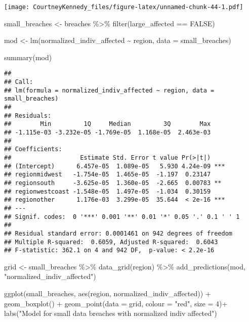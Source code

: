 \documentclass[
]{article}
\newenvironment{Shaded}{\begin{snugshade}}{\end{snugshade}}
\newcommand{\AttributeTok}[1]{\textcolor[rgb]{0.77,0.63,0.00}{#1}}
\newcommand{\ConstantTok}[1]{\textcolor[rgb]{0.00,0.00,0.00}{#1}}
\newcommand{\DecValTok}[1]{\textcolor[rgb]{0.00,0.00,0.81}{#1}}
\newcommand{\FunctionTok}[1]{\textcolor[rgb]{0.00,0.00,0.00}{#1}}
\newcommand{\NormalTok}[1]{#1}
\newcommand{\OtherTok}[1]{\textcolor[rgb]{0.56,0.35,0.01}{#1}}
\newcommand{\SpecialCharTok}[1]{\textcolor[rgb]{0.00,0.00,0.00}{#1}}
\newcommand{\StringTok}[1]{\textcolor[rgb]{0.31,0.60,0.02}{#1}}
\begin{document}
\texttt{[image: CourtneyKennedy\_files/figure-latex/unnamed-chunk-44-1.pdf]}

\begin{Shaded}
\begin{Highlighting}[]
\NormalTok{small\_breaches }\OtherTok{\textless{}{-}}\NormalTok{ breaches }\SpecialCharTok{\%\textgreater{}\%}
  \FunctionTok{filter}\NormalTok{(large\_affected }\SpecialCharTok{==} \ConstantTok{FALSE}\NormalTok{)}

\NormalTok{mod }\OtherTok{\textless{}{-}} \FunctionTok{lm}\NormalTok{(normalized\_indiv\_affected }\SpecialCharTok{\textasciitilde{}}\NormalTok{ region, }\AttributeTok{data =}\NormalTok{ small\_breaches)}

\FunctionTok{summary}\NormalTok{(mod)}
\end{Highlighting}
\end{Shaded}

\begin{verbatim}
## 
## Call:
## lm(formula = normalized_indiv_affected ~ region, data = small_breaches)
## 
## Residuals:
##        Min         1Q     Median         3Q        Max 
## -1.115e-03 -3.232e-05 -1.769e-05  1.168e-05  2.463e-03 
## 
## Coefficients:
##                   Estimate Std. Error t value Pr(>|t|)    
## (Intercept)      6.457e-05  1.089e-05   5.930 4.24e-09 ***
## regionmidwest   -1.754e-05  1.465e-05  -1.197  0.23147    
## regionsouth     -3.625e-05  1.360e-05  -2.665  0.00783 ** 
## regionwestcoast -1.548e-05  1.497e-05  -1.034  0.30159    
## regionother      1.176e-03  3.299e-05  35.644  < 2e-16 ***
## ---
## Signif. codes:  0 '***' 0.001 '**' 0.01 '*' 0.05 '.' 0.1 ' ' 1
## 
## Residual standard error: 0.0001461 on 942 degrees of freedom
## Multiple R-squared:  0.6059, Adjusted R-squared:  0.6043 
## F-statistic: 362.1 on 4 and 942 DF,  p-value: < 2.2e-16
\end{verbatim}

\begin{Shaded}
\begin{Highlighting}[]
\NormalTok{grid }\OtherTok{\textless{}{-}}\NormalTok{ small\_breaches }\SpecialCharTok{\%\textgreater{}\%}
  \FunctionTok{data\_grid}\NormalTok{(region) }\SpecialCharTok{\%\textgreater{}\%}
  \FunctionTok{add\_predictions}\NormalTok{(mod, }\StringTok{"normalized\_indiv\_affected"}\NormalTok{)}

\FunctionTok{ggplot}\NormalTok{(small\_breaches, }\FunctionTok{aes}\NormalTok{(region, normalized\_indiv\_affected)) }\SpecialCharTok{+}
  \FunctionTok{geom\_boxplot}\NormalTok{() }\SpecialCharTok{+}
  \FunctionTok{geom\_point}\NormalTok{(}\AttributeTok{data =}\NormalTok{ grid, }\AttributeTok{colour =} \StringTok{"red"}\NormalTok{, }\AttributeTok{size =} \DecValTok{4}\NormalTok{)}\SpecialCharTok{+}
  \FunctionTok{labs}\NormalTok{(}\StringTok{"Model for small data breaches with normalized indiv affected"}\NormalTok{)}
\end{Highlighting}
\end{Shaded}
\end{document}
